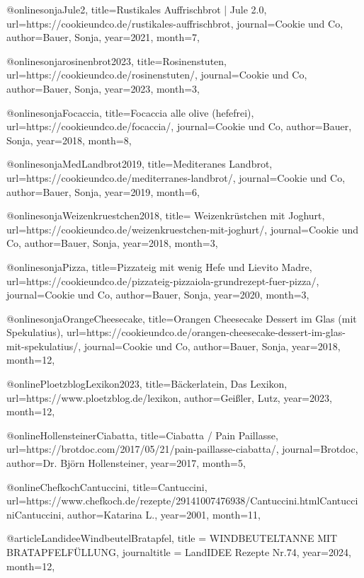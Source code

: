 @online{sonjaJule2,
    title={Rustikales Auffrischbrot | Jule 2.0}, 
    url={https://cookieundco.de/rustikales-auffrischbrot}, 
    journal={Cookie und Co}, 
    author={Bauer, Sonja}, 
    year={2021}, 
    month={7},
}

@online{sonjarosinenbrot2023,
    title={Rosinenstuten}, 
    url={https://cookieundco.de/rosinenstuten/}, 
    journal={Cookie und Co}, 
    author={Bauer, Sonja}, 
    year={2023}, 
    month={3},
}

@online{sonjaFocaccia,
    title={Focaccia alle olive (hefefrei)}, 
    url={https://cookieundco.de/focaccia/}, 
    journal={Cookie und Co}, 
    author={Bauer, Sonja}, 
    year={2018}, 
    month={8},
}

@online{sonjaMedLandbrot2019,
    title={Mediteranes Landbrot}, 
    url={https://cookieundco.de/mediterranes-landbrot/}, 
    journal={Cookie und Co}, 
    author={Bauer, Sonja}, 
    year={2019}, 
    month={6},
}

@online{sonjaWeizenkruestchen2018,
    title={ Weizenkrüstchen mit Joghurt}, 
    url={https://cookieundco.de/weizenkruestchen-mit-joghurt/}, 
    journal={Cookie und Co}, 
    author={Bauer, Sonja}, 
    year={2018}, 
    month={3},
}

@online{sonjaPizza,
    title={Pizzateig mit wenig Hefe und Lievito Madre}, 
    url={https://cookieundco.de/pizzateig-pizzaiola-grundrezept-fuer-pizza/}, 
    journal={Cookie und Co}, 
    author={Bauer, Sonja}, 
    year={2020}, 
    month={3},
}

@online{sonjaOrangeCheesecake,
    title={Orangen Cheesecake Dessert im Glas (mit Spekulatius)}, 
    url={https://cookieundco.de/orangen-cheesecake-dessert-im-glas-mit-spekulatius/}, 
    journal={Cookie und Co}, 
    author={Bauer, Sonja}, 
    year={2018}, 
    month={12},
}



@online{PloetzblogLexikon2023,
    title={Bäckerlatein, Das Lexikon}, 
    url={https://www.ploetzblog.de/lexikon}, 
    author={Geißler, Lutz}, 
    year={2023}, 
    month={12},
} 
 
 
@online{HollensteinerCiabatta,
    title={Ciabatta / Pain Paillasse}, 
    url={https://brotdoc.com/2017/05/21/pain-paillasse-ciabatta/}, 
    journal={Brotdoc}, 
    author={Dr. Björn Hollensteiner}, 
    year={2017}, 
    month={5},
}

@online{ChefkochCantuccini,
    title={Cantuccini}, 
    url={https://www.chefkoch.de/rezepte/29141007476938/Cantuccini.htmlCantucciniCantuccini}, 
    author={Katarina L.}, 
    year={2001}, 
    month={11},
}

@article{LandideeWindbeutelBratapfel,
    title = { WINDBEUTELTANNE MIT BRATAPFELFÜLLUNG},
    journaltitle = {LandIDEE Rezepte Nr.74},
    year={2024}, 
    month={12},
}

 
